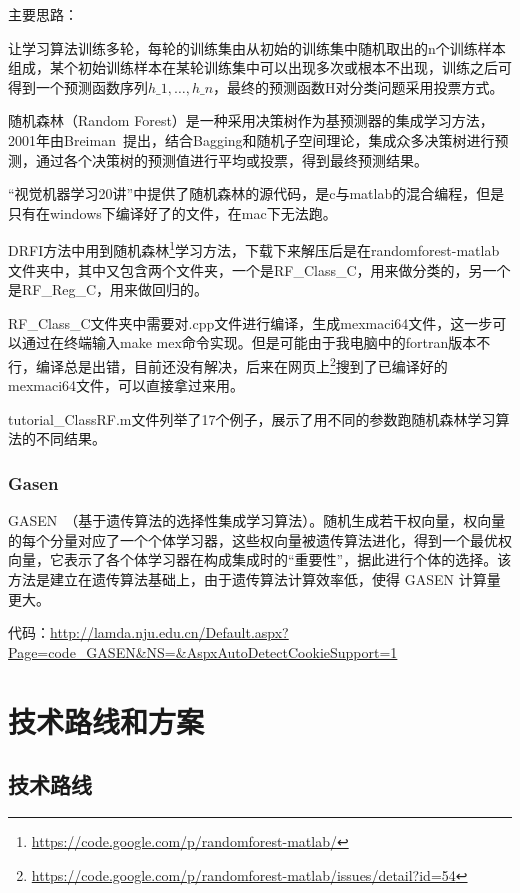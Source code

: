 \documentclass[12pt]{article}
\begin{document}
{\color{blue}主要思路}：

让学习算法训练多轮，每轮的训练集由从初始的训练集中随机取出的n个训练样本组成，某个初始训练样本在某轮训练集中可以出现多次或根本不出现，训练之后可得到一个预测函数序列$h\_1, \dots, h\_n$，最终的预测函数H对分类问题采用投票方式。

随机森林（Random Forest）是一种采用决策树作为基预测器的集成学习方法，2001年由Breiman~\cite{breiman2001random}提出，结合Bagging和随机子空间理论，集成众多决策树进行预测，通过各个决策树的预测值进行平均或投票，得到最终预测结果。

“视觉机器学习20讲”中提供了随机森林的源代码，是c与matlab的混合编程，但是只有在windows下编译好了的文件，在mac下无法跑。

DRFI方法中用到随机森林\footnote{\url{https://code.google.com/p/randomforest-matlab/}}学习方法，下载下来解压后是在randomforest-matlab文件夹中，其中又包含两个文件夹，一个是RF\_Class\_C，用来做分类的，另一个是RF\_Reg\_C，用来做回归的。

RF\_Class\_C文件夹中需要对.cpp文件进行编译，生成mexmaci64文件，这一步可以通过在终端输入make mex命令实现。但是可能由于我电脑中的fortran版本不行，编译总是出错，目前还没有解决，后来在网页上\footnote{\url{https://code.google.com/p/randomforest-matlab/issues/detail?id=54}}搜到了已编译好的mexmaci64文件，可以直接拿过来用。

tutorial\_ClassRF.m文件列举了17个例子，展示了用不同的参数跑随机森林学习算法的不同结果。

\subsubsection{Gasen}

GASEN~\cite{zhou2002ensembling}（基于遗传算法的选择性集成学习算法）。随机生成若干权向量，权向量的每个分量对应了一个个体学习器，这些权向量被遗传算法进化，得到一个最优权向量，它表示了各个体学习器在构成集成时的“重要性”，据此进行个体的选择。该方法是建立在遗传算法基础上，由于遗传算法计算效率低，使得 GASEN 计算量更大。

{\color{blue}代码}：\url{http://lamda.nju.edu.cn/Default.aspx?Page=code_GASEN&NS=&AspxAutoDetectCookieSupport=1}

\section{技术路线和方案}

\subsection{技术路线}
\end{document}
